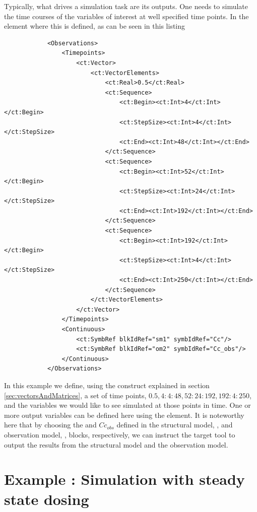 Typically, what drives a simulation task are its outputs. One needs to simulate 
the time courses of the variables of interest at well specified time points. In
\pharmml the  element where this is defined, as can be seen
in this listing 
\lstset{language=XML}
\begin{lstlisting}
            <Observations>
                <Timepoints>
                    <ct:Vector>
                        <ct:VectorElements>
                            <ct:Real>0.5</ct:Real>
                            <ct:Sequence>
                                <ct:Begin><ct:Int>4</ct:Int></ct:Begin>
                                <ct:StepSize><ct:Int>4</ct:Int></ct:StepSize>
                                <ct:End><ct:Int>48</ct:Int></ct:End>
                            </ct:Sequence>
                            <ct:Sequence>
                                <ct:Begin><ct:Int>52</ct:Int></ct:Begin>
                                <ct:StepSize><ct:Int>24</ct:Int></ct:StepSize>
                                <ct:End><ct:Int>192</ct:Int></ct:End>
                            </ct:Sequence>
                            <ct:Sequence>
                                <ct:Begin><ct:Int>192</ct:Int></ct:Begin>
                                <ct:StepSize><ct:Int>4</ct:Int></ct:StepSize>
                                <ct:End><ct:Int>250</ct:Int></ct:End>
                            </ct:Sequence>
                        </ct:VectorElements>
                    </ct:Vector>
                </Timepoints>
                <Continuous>
                    <ct:SymbRef blkIdRef="sm1" symbIdRef="Cc"/>
                    <ct:SymbRef blkIdRef="om2" symbIdRef="Cc_obs"/>
                </Continuous>
            </Observations>
\end{lstlisting}
In this example we define, using the  construct explained in 
section \ref{sec:vectorsAndMatrices}, a set of time points, $0.5, 4:4:48, 
52:24:192, 192:4:250$, and the
variables we would like to see simulated at those points in time. 
One or more output variables can be defined here using the 
element. It is noteworthy here that by choosing the  and $Cc_{obs}$ defined
in the structural model, , and observation model, , blocks, 
respectively, we can instruct the target tool to output the results from the structural model 
and the observation model.


\section{Example \theexamples: Simulation with steady state dosing}
\label{sec:eg2}

